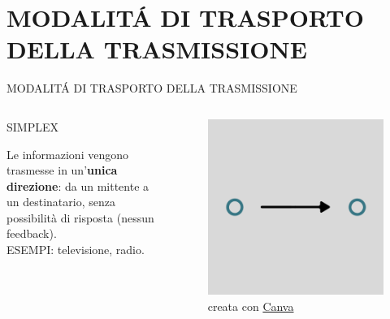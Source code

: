 \documentclass[aspectratio=1610,handout]{beamer}
\begin{document}
\section{MODALIT\'A DI TRASPORTO DELLA TRASMISSIONE}

\begin{frame}{MODALIT\'A DI TRASPORTO DELLA TRASMISSIONE}
    \begin{columns}
        \begin{alertblock}{SIMPLEX}
            \begin{minipage}{0.96\linewidth}
                \justifying
                Le informazioni vengono trasmesse in un'\textbf{unica direzione}: da un mittente a un 
                destinatario, senza possibilità di risposta (nessun feedback).\\
                ESEMPI: televisione, radio.
            \end{minipage}
        \end{alertblock}
           \begin{figure}
               \includegraphics[width=\linewidth]{img/simplex.png}
               \caption{{creata con \href{https://www.canva.com}{Canva}}}
           \end{figure}
    \end{columns}
\end{frame}
\end{document}
